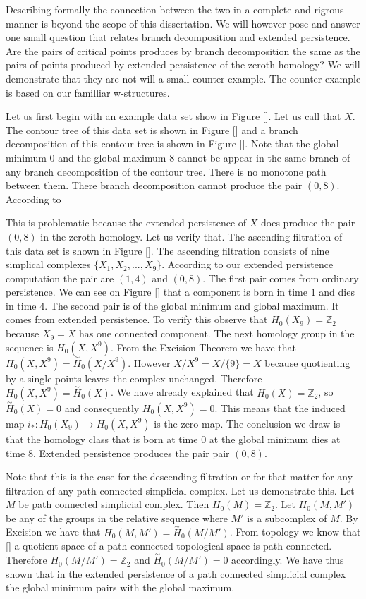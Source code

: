 Describing formally the connection between the two in a complete and rigrous manner is beyond the scope of this dissertation. We will however pose and answer one small question that relates branch decomposition and extended persistence. Are the pairs of critical points produces by branch decomposition the same as the pairs of points produced by extended persistence of the zeroth homology? We will demonstrate that they are not will a small counter example. The counter example is based on our familliar w-structures.

Let us first begin with an example data set show in Figure []. Let us call that $X$. The contour tree of this data set is shown in Figure [] and a branch decomposition of this contour tree is shown in Figure []. Note that the global minimum $0$ and the global maximum $8$ cannot be appear in the same branch of any branch decomposition of the contour tree. There is no monotone path between them. There branch decomposition cannot produce the pair $(0, 8)$. According to \cite{ct-branch-decomp}

This is problematic because the extended persistence of $X$ does produce the pair $(0, 8)$ in the zeroth homology. Let us verify that. The ascending filtration of this data set is shown in Figure []. The ascending filtration consists of nine simplical complexes $\{X_1, X_2, ..., X_9\}$. According to our extended persistence computation the pair are $(1, 4)$ and $(0, 8)$. The first pair comes from ordinary persistence. We can see on Figure [] that a component is born in time $1$ and dies in time $4$. The second pair is of the global minimum and global maximum. It comes from extended persistence. To verify this observe that $H_0(X_9) = \mathbb{Z}_2$ because $X_9 = X$ has one connected component.
The next homology group in the sequence is $H_0(X, X^9)$. From the Excision Theorem we have that $H_0(X, X^9) = \overset{\sim}{H}_0(X / X^9)$. However $X / X^9 = X / \{9\} = X$ because quotienting by a single points leaves the complex unchanged. Therefore $H_0(X, X^9) =
\overset{\sim}{H}_0(X)$. We have already explained that $H_0(X) = \mathbb{Z}_2$, so $\overset{\sim}{H}_0(X) = 0$ and consequently $H_0(X, X^9) = 0$. This means that the induced map $i_* : H_0(X_9) \to H_0(X, X^9)$ is the zero map. The conclusion we draw is that the homology class that is born at time $0$ at the global minimum dies at time $8$. Extended persistence produces the pair pair $(0, 8)$.

Note that this is the case for the descending filtration or for that matter for any filtration of any path connected simplicial complex. Let us demonstrate this. Let $M$ be path connected simplicial complex. Then $H_0(M) = \mathbb{Z}_2$. Let $H_0(M, M')$ be any of the groups in the relative sequence where $M'$ is a subcomplex of $M$. By Excision we have that $H_0(M, M') = \overset{\sim}{H}_0(M / M')$. From topology we know that [] a quotient space of a path connected topological space is path connected. Therefore $H_0(M / M') = \mathbb{Z}_2$ and $\overset{\sim}{H}_0(M / M') = 0$ accordingly. We have thus shown that in the extended persistence of a path connected simplicial complex the global minimum pairs with the global maximum.

